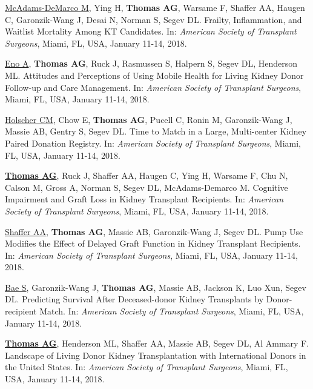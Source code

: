 \documentclass[10pt]{article}
\begin{document}
\begin{bibenum}
\item \underline{McAdams-DeMarco M}, Ying H, \textbf{Thomas AG}, Warsame F,
  Shaffer AA, Haugen C, Garonzik-Wang J, Desai N, Norman S, Segev DL.
  Frailty, Inflammation, and Waitlist Mortality Among KT Candidates.
  In: \emph{American Society of Transplant Surgeons},
  Miami, FL, USA, January 11-14, 2018.

\item \underline{Eno A}, \textbf{Thomas AG}, Ruck J, Rasmussen S, Halpern S,
  Segev DL, Henderson ML. Attitudes and Perceptions of Using Mobile Health
  for Living Kidney Donor Follow-up and Care Management.
  In: \emph{American Society of Transplant Surgeons},
  Miami, FL, USA, January 11-14, 2018.

\item \underline{Holscher CM}, Chow E, \textbf{Thomas AG}, Pucell C, Ronin M,
  Garonzik-Wang J, Massie AB, Gentry S, Segev DL. Time to Match in a Large,
  Multi-center Kidney Paired Donation Registry.
  In: \emph{American Society of Transplant Surgeons},
  Miami, FL, USA, January 11-14, 2018.

\item \underline{\textbf{Thomas AG}}, Ruck J, Shaffer AA, Haugen C,
  Ying H, Warsame F, Chu N, Calson M, Gross A, Norman S, Segev DL,
  McAdams-Demarco M. Cognitive Impairment and Graft Loss in
  Kidney Transplant Recipients.
  In: \emph{American Society of Transplant Surgeons},
  Miami, FL, USA, January 11-14, 2018.

\item \underline{Shaffer AA}, \textbf{Thomas AG}, Massie AB,
  Garonzik-Wang J, Segev DL. Pump Use Modifies the Effect of Delayed
  Graft Function in Kidney Transplant Recipients.
  In: \emph{American Society of Transplant Surgeons},
  Miami, FL, USA, January 11-14, 2018.

\item \underline{Bae S}, Garonzik-Wang J, \textbf{Thomas AG}, Massie AB,
  Jackson K, Luo Xun, Segev DL.
  Predicting Survival After Deceased-donor Kidney Transplants by
  Donor-recipient Match.
  In: \emph{American Society of Transplant Surgeons},
  Miami, FL, USA, January 11-14, 2018.

\item \underline{\textbf{Thomas AG}}, Henderson ML, Shaffer AA,
  Massie AB, Segev DL, Al Ammary F. Landscape of Living Donor Kidney
  Transplantation with International Donors in the United States.
  In: \emph{American Society of Transplant Surgeons},
  Miami, FL, USA, January 11-14, 2018.


\end{bibenum}
\end{document}
